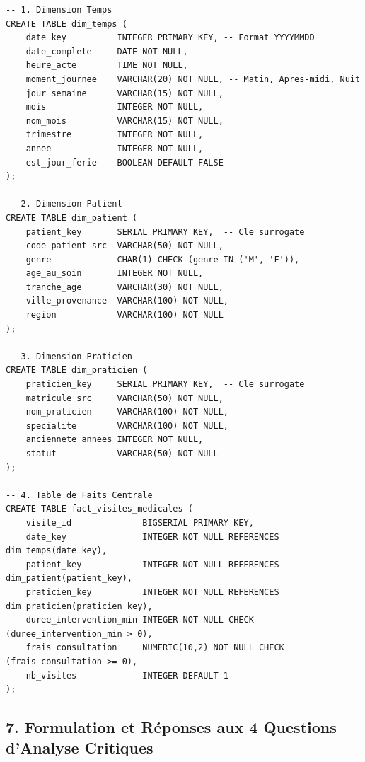 \documentclass[11pt, a4paper]{article}
\begin{document}
\begin{lstlisting}[caption={Script SQL de création des tables dimensionnelles et de faits}]
-- 1. Dimension Temps
CREATE TABLE dim_temps (
    date_key          INTEGER PRIMARY KEY, -- Format YYYYMMDD
    date_complete     DATE NOT NULL,
    heure_acte        TIME NOT NULL,
    moment_journee    VARCHAR(20) NOT NULL, -- Matin, Apres-midi, Nuit
    jour_semaine      VARCHAR(15) NOT NULL,
    mois              INTEGER NOT NULL,
    nom_mois          VARCHAR(15) NOT NULL,
    trimestre         INTEGER NOT NULL,
    annee             INTEGER NOT NULL,
    est_jour_ferie    BOOLEAN DEFAULT FALSE
);

-- 2. Dimension Patient
CREATE TABLE dim_patient (
    patient_key       SERIAL PRIMARY KEY,  -- Cle surrogate
    code_patient_src  VARCHAR(50) NOT NULL,
    genre             CHAR(1) CHECK (genre IN ('M', 'F')),
    age_au_soin       INTEGER NOT NULL,
    tranche_age       VARCHAR(30) NOT NULL,
    ville_provenance  VARCHAR(100) NOT NULL,
    region            VARCHAR(100) NOT NULL
);

-- 3. Dimension Praticien
CREATE TABLE dim_praticien (
    praticien_key     SERIAL PRIMARY KEY,  -- Cle surrogate
    matricule_src     VARCHAR(50) NOT NULL,
    nom_praticien     VARCHAR(100) NOT NULL,
    specialite        VARCHAR(100) NOT NULL,
    anciennete_annees INTEGER NOT NULL,
    statut            VARCHAR(50) NOT NULL
);

-- 4. Table de Faits Centrale
CREATE TABLE fact_visites_medicales (
    visite_id              BIGSERIAL PRIMARY KEY,
    date_key               INTEGER NOT NULL REFERENCES dim_temps(date_key),
    patient_key            INTEGER NOT NULL REFERENCES dim_patient(patient_key),
    praticien_key          INTEGER NOT NULL REFERENCES dim_praticien(praticien_key),
    duree_intervention_min INTEGER NOT NULL CHECK (duree_intervention_min > 0),
    frais_consultation     NUMERIC(10,2) NOT NULL CHECK (frais_consultation >= 0),
    nb_visites             INTEGER DEFAULT 1
);
\end{lstlisting}

\newpage

\subsection{7. Formulation et Réponses aux 4 Questions d'Analyse Critiques}
\end{document}
